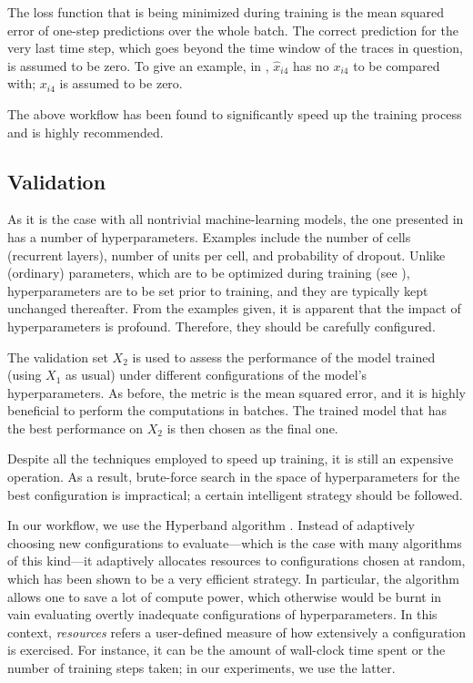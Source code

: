 The loss function that is being minimized during training is the mean squared
error \cite{hastie2009} of one-step predictions over the whole batch. The
correct prediction for the very last time step, which goes beyond the time
window of the traces in question, is assumed to be zero. To give an example, in
, $\hat{x}_{i4}$ has no $x_{i4}$ to be compared with; $x_{i4}$ is
assumed to be zero.

The above workflow has been found to significantly speed up the training
process and is highly recommended.

\subsection{Validation} 
As it is the case with all nontrivial machine-learning models, the one presented
in  has a number of hyperparameters. Examples include the number of
cells (recurrent layers), number of units per cell, and probability of dropout.
Unlike (ordinary) parameters, which are to be optimized during training (see
), hyperparameters are to be set prior to training, and they are
typically kept unchanged thereafter. From the examples given, it is apparent
that the impact of hyperparameters is profound. Therefore, they should be
carefully configured.

The validation set $X_2$ is used to assess the performance of the model trained
(using $X_1$ as usual) under different configurations of the model's
hyperparameters. As before, the metric is the mean squared error, and it is
highly beneficial to perform the computations in batches. The trained model that
has the best performance on $X_2$ is then chosen as the final one.

Despite all the techniques employed to speed up training, it is still an
expensive operation. As a result, brute-force search in the space of
hyperparameters for the best configuration is impractical; a certain intelligent
strategy should be followed.

In our workflow, we use the Hyperband algorithm \cite{li2016}. Instead of
adaptively choosing new configurations to evaluate---which is the case with many
algorithms of this kind---it adaptively allocates resources to configurations
chosen at random, which has been shown to be a very efficient strategy. In
particular, the algorithm allows one to save a lot of compute power, which
otherwise would be burnt in vain evaluating overtly inadequate configurations of
hyperparameters. In this context, \emph{resources} refers a user-defined measure
of how extensively a configuration is exercised. For instance, it can be the
amount of wall-clock time spent or the number of training steps taken; in our
experiments, we use the latter.

